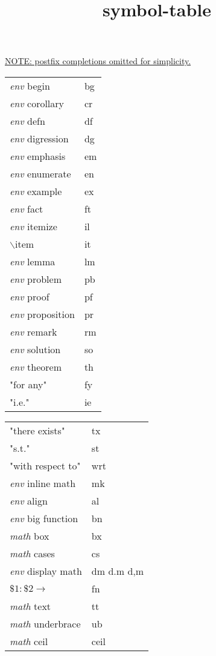\documentclass[10pt]{beamer}
\title{symbol-table}
\begin{document}
\begin{frame}
\underline{NOTE: postfix completions omitted for simplicity.}


\begin{tabular}{ll}
\textit{env} begin & bg \\
\textit{env} corollary & cr \\
\textit{env} defn & df \\
\textit{env} digression & dg \\
\textit{env} emphasis & em \\
\textit{env} enumerate & en \\
\textit{env} example & ex \\
\textit{env} fact & ft \\
\textit{env} itemize & il \\
$\backslash$item & it \\
\textit{env} lemma & lm \\
\textit{env} problem & pb \\
\textit{env} proof & pf \\
\textit{env} proposition & pr \\
\textit{env} remark & rm \\
\textit{env} solution & so \\
\textit{env} theorem & th \\
"for any" & fy \\
"i.e." & ie \\
\end{tabular}
\hspace*{1ex}
\vrule
\begin{tabular}{ll}
"there exists" & tx \\
"s.t." & st \\
"with respect to" & wrt \\
\textit{env} inline math & mk \\
\textit{env} align & al \\
\textit{env} big function & bn \\
\textit{math} box & bx \\
\textit{math} cases & cs \\
\textit{env} display math & dm d.m d,m \\
$\text{\$1}\colon \text{\$2} \to$ & fn \\
\textit{math} text & tt \\
\textit{math} underbrace & ub \\
\textit{math} ceil & ceil \\

\end{tabular}
\end{frame}
\end{document}
